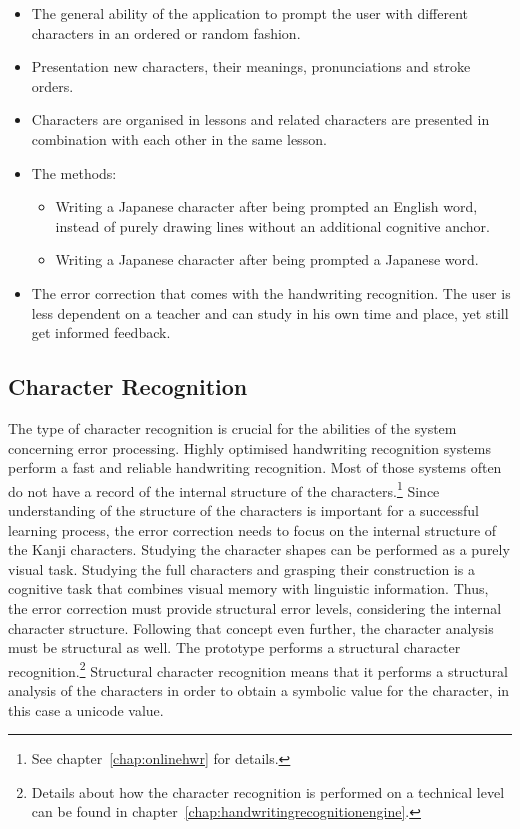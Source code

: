 \begin{itemize}
  \item The general ability of the application to prompt the user with 
        different characters in an ordered or random fashion.
  \item Presentation new characters, their meanings, pronunciations and
        stroke orders.
  \item Characters are organised in lessons and related characters are presented
        in combination with each other in the same lesson.
  \item The methods:
    \begin{itemize}
      \item Writing a Japanese character after being prompted an English word, 
            instead of purely drawing lines without an additional cognitive 
            anchor.
      \item Writing a Japanese character after being prompted a Japanese word.
    \end{itemize}
  \item The error correction that comes with the handwriting recognition. The 
        user is less dependent on a teacher and can study in his own time and 
        place, yet still get informed feedback.
\end{itemize}
 
\subsection{Character Recognition}
\label{sec:concept:characterrecognition}

The type of character recognition is crucial for the abilities of the system 
concerning error processing. Highly optimised handwriting recognition systems
perform a fast and reliable handwriting recognition. Most of those systems
often do not have a  record of the internal structure of the 
characters.\footnote{See chapter~\ref{chap:onlinehwr} for details.}
Since understanding of the structure of the characters is important for a 
successful learning process, the error correction needs to focus on the internal
structure of the Kanji characters. Studying the character shapes can be 
performed as a purely visual task. Studying the full characters and grasping
their construction is a cognitive task that combines visual memory with
linguistic information. Thus, the error correction must provide structural
error levels, considering the internal character structure. Following that
concept even further, the character analysis must be structural as well.
The prototype performs a structural character 
recognition.\footnote{Details about how the character recognition is
performed on a technical level can be found in 
chapter~\ref{chap:handwritingrecognitionengine}.}
Structural character recognition means that it performs a structural analysis
of the characters in order to obtain a symbolic value for the character,
in this case a unicode value. 


